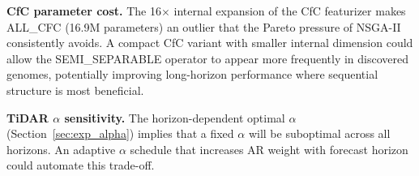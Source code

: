 \textbf{CfC parameter cost.}
The 16$\times$ internal expansion of the CfC featurizer makes ALL\_CFC (16.9M parameters) an outlier that the Pareto pressure of NSGA-II consistently avoids.
A compact CfC variant with smaller internal dimension could allow the SEMI\_SEPARABLE operator to appear more frequently in discovered genomes, potentially improving long-horizon performance where sequential structure is most beneficial.

\textbf{TiDAR $\alpha$ sensitivity.}
The horizon-dependent optimal $\alpha$ (Section~\ref{sec:exp_alpha}) implies that a fixed $\alpha$ will be suboptimal across all horizons.
An adaptive $\alpha$ schedule that increases AR weight with forecast horizon could automate this trade-off.